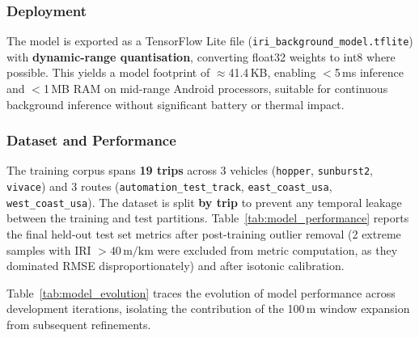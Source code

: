 \documentclass[conference]{IEEEtran}
\begin{document}
\subsubsection{Deployment}

The model is exported as a TensorFlow Lite file (\texttt{iri\_background\_model.tflite}) with \textbf{dynamic-range quantisation}, converting float32 weights to int8 where possible.
This yields a model footprint of $\approx$41.4\,KB, enabling $<$5\,ms inference and $<$1\,MB RAM on mid-range Android processors, suitable for continuous background inference without significant battery or thermal impact.

\subsubsection{Dataset and Performance}

The training corpus spans \textbf{19 trips} across 3 vehicles (\texttt{hopper}, \texttt{sunburst2}, \texttt{vivace}) and 3 routes (\texttt{automation\_test\_track}, \texttt{east\_coast\_usa}, \texttt{west\_coast\_usa}).
The dataset is split \textbf{by trip} to prevent any temporal leakage between the training and test partitions.
Table~\ref{tab:model_performance} reports the final held-out test set metrics after post-training outlier removal (2 extreme samples with IRI $> 40\,\text{m/km}$ were excluded from metric computation, as they dominated RMSE disproportionately) and after isotonic calibration.

\begin{table}[htbp]
\centering
\caption{Model Performance on Held-Out Test Set (Post-Calibration)}
\label{tab:model_performance}
\end{table}

Table~\ref{tab:model_evolution} traces the evolution of model performance across development iterations, isolating the contribution of the 100\,m window expansion from subsequent refinements.
\end{document}

